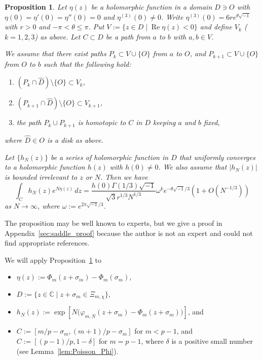 \documentclass[a4paper,dvipdfmx]{amsart}
\theoremstyle{plain}
\newtheorem{prop}[thm]{Proposition}
\theoremstyle{definition}
\theoremstyle{remark}
\newcommand{\C}{\mathbb{C}}
\renewcommand{\Re}{\operatorname{Re}}
\renewcommand{\i}{\sqrt{-1}}
\newcommand{\saddle}{\sigma}
\numberwithin{equation}{section}
\begin{document}
\begin{prop}\label{prop:saddle}
Let $\eta(z)$ be a holomorphic function in a domain $D\ni O$ with $\eta(0)=\eta'(0)=\eta''(0)=0$ and $\eta^{(3)}(0)\ne0$.
Write $\eta^{(3)}(0)=6re^{\theta\i}$ with $r>0$ and $-\pi<\theta\le\pi$.
Put $V:=\{z\in D\mid\Re{\eta(z)}<0\}$ and define $V_k$ \rm{(}$k=1,2,3$\rm{)} as above.
Let $C\subset D$ be a path from $a$ to $b$ with $a,b\in V$.
\par
We assume that there exist paths $P_{k}\subset V\cup\{O\}$ from $a$ to $O$, and $P_{k+1}\subset V\cup\{O\}$ from $O$ to $b$ such that the following hold:
\begin{enumerate}
\item
$(P_{k}\cap\hat{D})\setminus\{O\}\subset V_{k}$,
\item
$(P_{k+1}\cap\hat{D})\setminus\{O\}\subset V_{k+1}$,
\item
the path $P_{k}\cup P_{k+1}$ is homotopic to $C$ in $D$ keeping $a$ and $b$ fixed,
\end{enumerate}
where $\hat{D}\in O$ is a disk as above.
\par
Let $\{h_N(z)\}$ be a series of holomorphic function in $D$ that uniformly converges to a holomorphic function $h(z)$ with $h(0)\ne0$.
We also assume that $\left|h_N(z)\right|$ is bounded irrelevant to $z$ or $N$.
Then we have
\begin{equation}\label{eq:saddle}
  \int_{C}h_N(z)e^{N\eta(z)}\,dz
  =
  \frac{h(0)\Gamma(1/3)\i}{\sqrt{3}r^{1/3}N^{1/3}}\omega^{k}e^{-\theta\i/3}
  \left(1+O(N^{-1/3})\right)
\end{equation}
as $N\to\infty$, where $\omega:=e^{2\pi\i/3}$.
\end{prop}
The proposition may be well known to experts, but we give a proof in Appendix~\ref{sec:saddle_proof} because the author is not an expert and could not find appropriate references.
\par
\par
We will apply Proposition~\ref{prop:saddle} to
\begin{itemize}
\item
$\eta(z):=\Phi_{m}(z+\saddle_m)-\Phi_m(\saddle_m)$,
\item
$D:=\{z\in\C\mid z+\saddle_m\in\Xi_{m,\chi}\}$,
\item
$h_N(z):=\exp\left[N\bigl(\varphi_{m,N}(z+\saddle_m)-\Phi_{m}(z+\saddle_m)\bigr)\right]$, and
\item
$C:=[m/p-\saddle_m,(m+1)/p-\saddle_m]$ for $m<p-1$, and $C:=[(p-1)/p,1-\delta]$ for $m=p-1$, where $\delta$ is a positive small number (see Lemma~\ref{lem:Poisson_Phi}).
\end{itemize}
\end{document}

